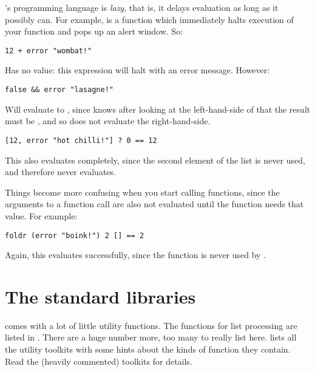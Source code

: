 \nip{}'s programming language is \emph{lazy}, that is, it delays evaluation
as long as it possibly can.  For example,  is a function which 
immediately halts execution of your function and pops up an alert window. So:

\begin{verbatim}
12 + error "wombat!"
\end{verbatim}

\noindent
Has no value: this expression will halt with an error message. However:

\begin{verbatim}
false && error "lasagne!"
\end{verbatim}

\noindent
Will evaluate to , since \nip{} knows after looking at the
left-hand-side of \ct{\&\&} that the result must be , and so does
not evaluate the right-hand-side.

\begin{verbatim}
[12, error "hot chilli!"] ? 0 == 12
\end{verbatim}

\noindent
This also evaluates completely, since the second element of the list is never
used, and therefore never evaluates.

Things become more confusing when you start calling functions, since the
arguments to a function call are also not evaluated until the function needs
that value. For example:

\begin{verbatim}
foldr (error "boink!") 2 [] == 2
\end{verbatim}

\noindent
Again, this evaluates successfully, since the function is never used by
.

\section{The standard libraries}

\nip{} comes with a lot of little utility functions. The functions for list
processing are listed in . There are a huge number more, too
many to really list here.  lists all the utility toolkits
with some hints about the kinds of function they contain. Read the (heavily
commented) toolkits for details.

